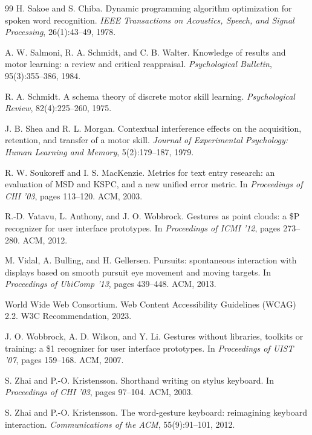 \begin{thebibliography}{99}
 H. Sakoe and S. Chiba. Dynamic programming algorithm optimization for spoken word recognition. \emph{IEEE Transactions on Acoustics, Speech, and Signal Processing}, 26(1):43--49, 1978.

 A. W. Salmoni, R. A. Schmidt, and C. B. Walter. Knowledge of results and motor learning: a review and critical reappraisal. \emph{Psychological Bulletin}, 95(3):355--386, 1984.

 R. A. Schmidt. A schema theory of discrete motor skill learning. \emph{Psychological Review}, 82(4):225--260, 1975.

 J. B. Shea and R. L. Morgan. Contextual interference effects on the acquisition, retention, and transfer of a motor skill. \emph{Journal of Experimental Psychology: Human Learning and Memory}, 5(2):179--187, 1979.

 R. W. Soukoreff and I. S. MacKenzie. Metrics for text entry research: an evaluation of MSD and KSPC, and a new unified error metric. In \emph{Proceedings of CHI '03}, pages 113--120. ACM, 2003.

 R.-D. Vatavu, L. Anthony, and J. O. Wobbrock. Gestures as point clouds: a \$P recognizer for user interface prototypes. In \emph{Proceedings of ICMI '12}, pages 273--280. ACM, 2012.

 M. Vidal, A. Bulling, and H. Gellersen. Pursuits: spontaneous interaction with displays based on smooth pursuit eye movement and moving targets. In \emph{Proceedings of UbiComp '13}, pages 439--448. ACM, 2013.

 World Wide Web Consortium. Web Content Accessibility Guidelines (WCAG) 2.2. W3C Recommendation, 2023.

 J. O. Wobbrock, A. D. Wilson, and Y. Li. Gestures without libraries, toolkits or training: a \$1 recognizer for user interface prototypes. In \emph{Proceedings of UIST '07}, pages 159--168. ACM, 2007.

 S. Zhai and P.-O. Kristensson. Shorthand writing on stylus keyboard. In \emph{Proceedings of CHI '03}, pages 97--104. ACM, 2003.

 S. Zhai and P.-O. Kristensson. The word-gesture keyboard: reimagining keyboard interaction. \emph{Communications of the ACM}, 55(9):91--101, 2012.

\end{thebibliography}
